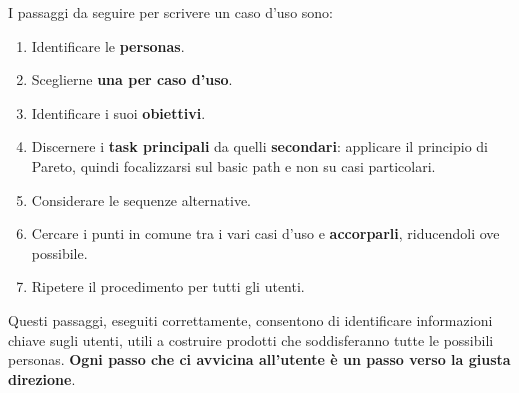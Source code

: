 I passaggi da seguire per scrivere un caso d'uso sono:

\begin{multicols}{2}


	\begin{enumerate}
		\item Identificare le \textbf{personas}.
		\item Sceglierne \textbf{una per caso d'uso}.
		\item Identificare i suoi \textbf{obiettivi}.
		\item Discernere i \textbf{task principali} da quelli \textbf{secondari}: applicare il principio di Pareto, quindi focalizzarsi sul basic path e non su casi particolari.
		\item Considerare le sequenze alternative.
		\item Cercare i punti in comune tra i vari casi d'uso e \textbf{accorparli}, riducendoli ove possibile.
		\item Ripetere il procedimento per tutti gli utenti.
	\end{enumerate}
\end{multicols}

Questi passaggi, eseguiti correttamente, consentono di identificare informazioni chiave sugli utenti, utili a costruire prodotti che soddisferanno tutte le possibili personas. \textbf{Ogni passo che ci avvicina all'utente è un passo verso la giusta direzione}.

\pagebreak
